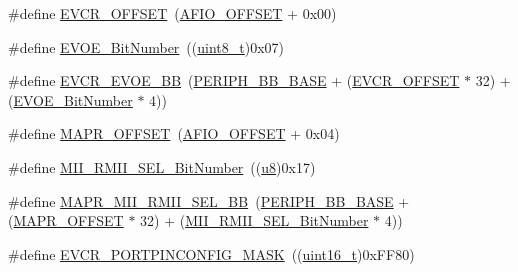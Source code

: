 \begin{DoxyCompactItemize}
\item 
\#define \hyperlink{group___g_p_i_o___private___defines_gaf8c24f39392c89142f1b97a418669d5d}{E\+V\+C\+R\+\_\+\+O\+F\+F\+S\+ET}~(\hyperlink{openmotestm_2library_2src_2stm32f10x__gpio_8c_a0ecdd0dd5180e1ee385c22f66a2cd660}{A\+F\+I\+O\+\_\+\+O\+F\+F\+S\+ET} + 0x00)
\item 
\#define \hyperlink{group___g_p_i_o___private___defines_ga8e4fdee57fe3447cdbc5d00ccab60c18}{E\+V\+O\+E\+\_\+\+Bit\+Number}~((\hyperlink{_p_e___types_8h_aba7bc1797add20fe3efdf37ced1182c5}{uint8\+\_\+t})0x07)
\item 
\#define \hyperlink{group___g_p_i_o___private___defines_ga6e4f8c4e3def38811ac6c03b4f64240b}{E\+V\+C\+R\+\_\+\+E\+V\+O\+E\+\_\+\+BB}~(\hyperlink{openmotestm_2library_2inc_2stm32f10x__map_8h_aed7efc100877000845c236ccdc9e144a}{P\+E\+R\+I\+P\+H\+\_\+\+B\+B\+\_\+\+B\+A\+SE} + (\hyperlink{openmotestm_2library_2src_2stm32f10x__gpio_8c_af8c24f39392c89142f1b97a418669d5d}{E\+V\+C\+R\+\_\+\+O\+F\+F\+S\+ET} $\ast$ 32) + (\hyperlink{openmotestm_2library_2src_2stm32f10x__gpio_8c_a8e4fdee57fe3447cdbc5d00ccab60c18}{E\+V\+O\+E\+\_\+\+Bit\+Number} $\ast$ 4))
\item 
\#define \hyperlink{group___g_p_i_o___private___defines_ga472f80f63d09e365d283675f3466c8a1}{M\+A\+P\+R\+\_\+\+O\+F\+F\+S\+ET}~(\hyperlink{openmotestm_2library_2src_2stm32f10x__gpio_8c_a0ecdd0dd5180e1ee385c22f66a2cd660}{A\+F\+I\+O\+\_\+\+O\+F\+F\+S\+ET} + 0x04)
\item 
\#define \hyperlink{group___g_p_i_o___private___defines_gad4a9bbd669109039291f942d923ff8ae}{M\+I\+I\+\_\+\+R\+M\+I\+I\+\_\+\+S\+E\+L\+\_\+\+Bit\+Number}~((\hyperlink{agilefox_2library_2inc_2stm32f10x__type_8h_aed742c436da53c1080638ce6ef7d13de}{u8})0x17)
\item 
\#define \hyperlink{group___g_p_i_o___private___defines_ga00e75433e8a45d7a55c021397cb85aa9}{M\+A\+P\+R\+\_\+\+M\+I\+I\+\_\+\+R\+M\+I\+I\+\_\+\+S\+E\+L\+\_\+\+BB}~(\hyperlink{openmotestm_2library_2inc_2stm32f10x__map_8h_aed7efc100877000845c236ccdc9e144a}{P\+E\+R\+I\+P\+H\+\_\+\+B\+B\+\_\+\+B\+A\+SE} + (\hyperlink{group___g_p_i_o___private___defines_ga472f80f63d09e365d283675f3466c8a1}{M\+A\+P\+R\+\_\+\+O\+F\+F\+S\+ET} $\ast$ 32) + (\hyperlink{group___g_p_i_o___private___defines_gad4a9bbd669109039291f942d923ff8ae}{M\+I\+I\+\_\+\+R\+M\+I\+I\+\_\+\+S\+E\+L\+\_\+\+Bit\+Number} $\ast$ 4))
\item 
\#define \hyperlink{group___g_p_i_o___private___defines_ga97d20e77a588a767e1a775dd4299d1c5}{E\+V\+C\+R\+\_\+\+P\+O\+R\+T\+P\+I\+N\+C\+O\+N\+F\+I\+G\+\_\+\+M\+A\+SK}~((\hyperlink{_p_e___types_8h_a1f1825b69244eb3ad2c7165ddc99c956}{uint16\+\_\+t})0x\+F\+F80)

\end{DoxyCompactItemize}
